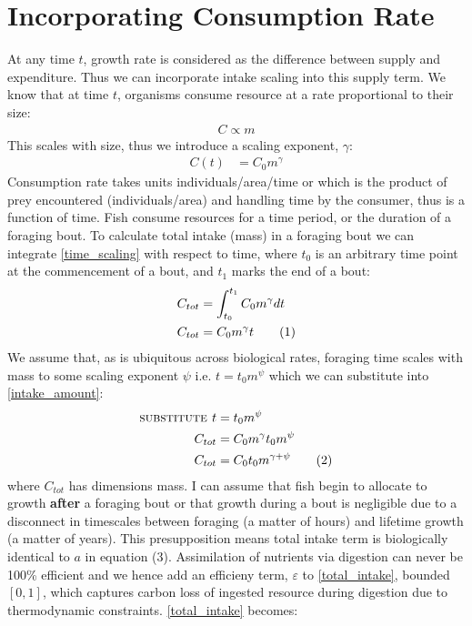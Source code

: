 \documentclass[a4paper]{article} %
\newcommand\numberthis{\addtocounter{equation}{1}\tag{\theequation}}
\begin{document}
\section{Incorporating Consumption Rate}
At any time $t$, growth rate is considered as the difference between supply and expenditure. Thus we can incorporate intake scaling into this supply term.
We know that at time $t$, organisms consume resource at a rate proportional to their size:
\begin{align*}
    C \propto m
\end{align*}
This scales with size, thus we introduce a scaling exponent, $\gamma$:
\begin{align}
    C(t) &= C_{0}m^{\gamma} \label{time_scaling}
\end{align}
Consumption rate takes units individuals/area/time or which is the product of prey encountered (individuals/area) and handling time by the consumer, thus is a function of time. Fish consume resources for a time period, or the duration of a foraging bout. To calculate total intake (mass) in a foraging bout we can integrate \eqref{time_scaling} with respect to time, where $t_0$ is an arbitrary time point at the commencement of a bout, and $t_1$ marks the end of a bout:
\begin{align*}
    C_{tot} &= \int_{t_{0}}^{t_{1}}C_{0}m^{\gamma}dt \\
    C_{tot} &= C_{0}m^{\gamma}t \numberthis \label{intake_amount}
\end{align*}
We assume that, as is ubiquitous across biological rates, foraging time scales with mass to some scaling exponent $\psi$ i.e. $t = t_{0}m^{\psi}$ which we can substitute into \eqref{intake_amount}:
\begin{align*}
    \textsc{substitute } t &= t_{0}m^{\psi} \\
    C_{tot} &= C_{0}m^{\gamma}t_{0}m^{\psi} \\
    C_{tot} &= C_{0}t_{0}m^{\gamma + \psi} \numberthis \label{total_intake}
\end{align*}
where $C_{tot}$ has dimensions mass. I can assume that fish begin to allocate to growth \textbf{after} a foraging bout or that growth during a bout is negligible due to a disconnect in timescales between foraging (a matter of hours) and lifetime growth (a matter of years). This presupposition means total intake term is biologically identical to $a$ in equation (3). Assimilation of nutrients via digestion can never be 100\% efficient and we hence add an efficieny term, $\varepsilon$ to \eqref{total_intake}, bounded $[0,1]$, which captures carbon loss of ingested resource during digestion due to thermodynamic constraints. \eqref{total_intake} becomes:
\end{document}
